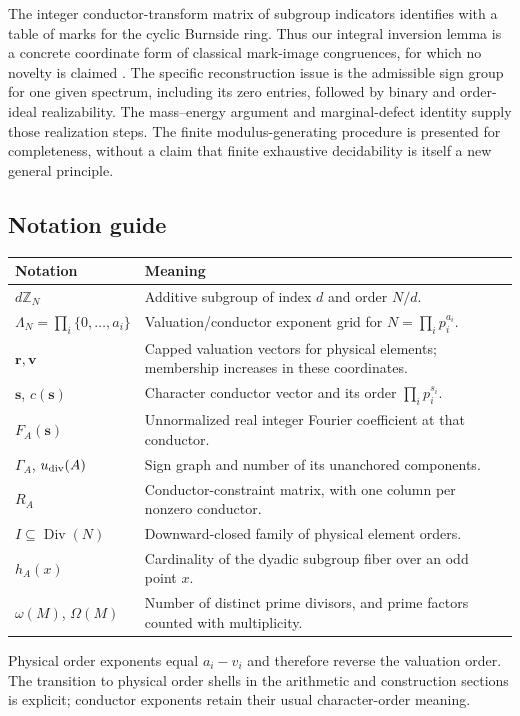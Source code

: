 \documentclass[11pt]{article}
\numberwithin{equation}{section}
\theoremstyle{definition}
\theoremstyle{remark}
\newcommand{\s}{\boldsymbol{s}}
\newcommand{\rvec}{\boldsymbol{r}}
\newcommand{\vv}{\boldsymbol{v}}
\newcommand{\Z}{\mathbb Z}
\DeclareMathOperator{\Div}{Div}
\begin{document}
The integer conductor-transform matrix of subgroup indicators identifies with a table of marks for the cyclic Burnside ring. Thus our integral inversion lemma is a concrete coordinate form of classical mark-image congruences, for which no novelty is claimed \cite{tomDieck1979,BoltjePfeiffer2008}. The specific reconstruction issue is the admissible sign group for one given spectrum, including its zero entries, followed by binary and order-ideal realizability. The mass--energy argument and marginal-defect identity supply those realization steps. The finite modulus-generating procedure is presented for completeness, without a claim that finite exhaustive decidability is itself a new general principle.

\subsection{Notation guide}
\begin{center}\small
\begin{tabular}{@{}p{.22\linewidth}p{.71\linewidth}@{}}\toprule
Notation & Meaning\\\midrule
$d\Z_N$ & Additive subgroup of index $d$ and order $N/d$.\\
$\Lambda_N=\prod_i\{0,\ldots,a_i\}$ & Valuation/conductor exponent grid for $N=\prod_i p_i^{a_i}$.\\
$\rvec,\vv$ & Capped valuation vectors for physical elements; membership increases in these coordinates.\\
$\s$, $c(\s)$ & Character conductor vector and its order $\prod_i p_i^{s_i}$.\\
$F_A(\s)$ & Unnormalized real integer Fourier coefficient at that conductor.\\
$\Gamma_A$, $u_{\rm div}(A)$ & Sign graph and number of its unanchored components.\\
$R_A$ & Conductor-constraint matrix, with one column per nonzero conductor.\\
$I\subseteq\Div(N)$ & Downward-closed family of physical element orders.\\
$h_A(x)$ & Cardinality of the dyadic subgroup fiber over an odd point $x$.\\
$\omega(M)$, $\Omega(M)$ & Number of distinct prime divisors, and prime factors counted with multiplicity.\\\bottomrule
\end{tabular}
\end{center}
Physical order exponents equal $a_i-v_i$ and therefore reverse the valuation order. The transition to physical order shells in the arithmetic and construction sections is explicit; conductor exponents retain their usual character-order meaning.
\end{document}
